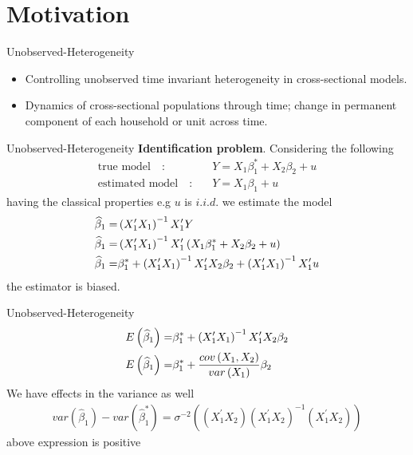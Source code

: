 \section{Motivation}

\begin{frame}{Unobserved-Heterogeneity}
	\begin{itemize}
		\item Controlling unobserved time invariant heterogeneity in cross-sectional models.	
		\item Dynamics of cross-sectional populations through time; change in permanent component of each household or unit across time.
	\end{itemize}
\end{frame}
\begin{frame}{Unobserved-Heterogeneity}
	\textbf{Identification problem}. Considering the following
		\begin{align*}
			\text{true model} \quad :& \quad Y=X_{1}\beta _{1}^{\ast }+X_{2}\beta_{2}+u \\
			\text{estimated model} \quad :& \quad Y=X_{1}\beta _{1}+u
		\end{align*}
	having the classical properties e.g $u$ is $i.i.d$. we estimate the model%
		\begin{align}
			\widehat{\beta }_{1} = &\left( X_{1}^{\prime }X_{1}\right)^{-1}X_{1}^{\prime }Y  \notag \\
			\widehat{\beta }_{1} = &\left( X_{1}^{\prime }X_{1}\right)
			^{-1}X_{1}^{\prime }\left( X_{1}\beta _{1}^{\ast }+X_{2}\beta _{2}+u\right) 
			\notag \\
			\widehat{\beta}_{1} = &\beta_{1}^{\ast}+\left(X_{1}^{\prime}X_{1}\right)^{-1}X_{1}^{\prime}X_{2}\beta_{2}+\left(X_{1}^{\prime}X_{1}\right) ^{-1}X_{1}^{\prime}u
		\end{align}
	the estimator is biased.
\end{frame}
\begin{frame}{Unobserved-Heterogeneity}
		\begin{align}
			E\left( \widehat{\beta }_{1}\right) = &\beta _{1}^{\ast }+\left(X_{1}^{\prime }X_{1}\right) ^{-1}X_{1}^{\prime }X_{2}\beta _{2}  \notag \\
			E\left( \widehat{\beta }_{1}\right) = &\beta _{1}^{\ast }+\frac{cov\left(X_{1},X_{2}\right) }{var\left( X_{1}\right) }\beta _{2}
		\end{align}
	We have effects in the variance as well%
		\begin{gather}
			var\left( \widehat{\beta }_{1}\right) -var\left( \widehat{\beta }_{1}^{\ast}\right) =\sigma ^{-2}\left( \left( X_{1}^{\prime }X_{2}\right) \left(X_{1}^{\prime }X_{2}\right) ^{-1}\left( X_{1}^{\prime }X_{2}\right) \right)
		\end{gather}
	above expression is positive
\end{frame}

